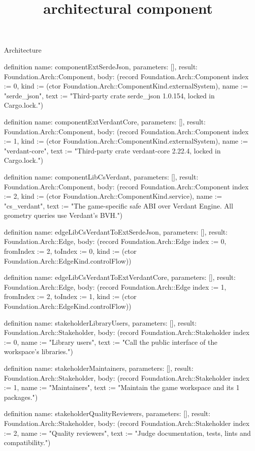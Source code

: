 \begin{lexlean}{Architecture}
\title{architectural component}
\begin{semanticmodule}
definition{
  name: componentExtSerdeJson,
  parameters: [],
  result: Foundation.Arch::Component,
  body: (record Foundation.Arch::Component {index := 0, kind := (ctor Foundation.Arch::ComponentKind.externalSystem), name := "serde_json", text := "Third-party crate serde_json 1.0.154, locked in Cargo.lock."})
}

definition{
  name: componentExtVerdantCore,
  parameters: [],
  result: Foundation.Arch::Component,
  body: (record Foundation.Arch::Component {index := 1, kind := (ctor Foundation.Arch::ComponentKind.externalSystem), name := "verdant-core", text := "Third-party crate verdant-core 2.22.4, locked in Cargo.lock."})
}

definition{
  name: componentLibCsVerdant,
  parameters: [],
  result: Foundation.Arch::Component,
  body: (record Foundation.Arch::Component {index := 2, kind := (ctor Foundation.Arch::ComponentKind.service), name := "cs_verdant", text := "The game-specific safe ABI over Verdant Engine. All geometry queries use Verdant's BVH."})
}

definition{
  name: edgeLibCsVerdantToExtSerdeJson,
  parameters: [],
  result: Foundation.Arch::Edge,
  body: (record Foundation.Arch::Edge {index := 0, fromIndex := 2, toIndex := 0, kind := (ctor Foundation.Arch::EdgeKind.controlFlow)})
}

definition{
  name: edgeLibCsVerdantToExtVerdantCore,
  parameters: [],
  result: Foundation.Arch::Edge,
  body: (record Foundation.Arch::Edge {index := 1, fromIndex := 2, toIndex := 1, kind := (ctor Foundation.Arch::EdgeKind.controlFlow)})
}

definition{
  name: stakeholderLibraryUsers,
  parameters: [],
  result: Foundation.Arch::Stakeholder,
  body: (record Foundation.Arch::Stakeholder {index := 0, name := "Library users", text := "Call the public interface of the workspace's libraries."})
}

definition{
  name: stakeholderMaintainers,
  parameters: [],
  result: Foundation.Arch::Stakeholder,
  body: (record Foundation.Arch::Stakeholder {index := 1, name := "Maintainers", text := "Maintain the game workspace and its 1 packages."})
}

definition{
  name: stakeholderQualityReviewers,
  parameters: [],
  result: Foundation.Arch::Stakeholder,
  body: (record Foundation.Arch::Stakeholder {index := 2, name := "Quality reviewers", text := "Judge documentation, tests, lints and compatibility."})
}


\end{semanticmodule}
\end{lexlean}
